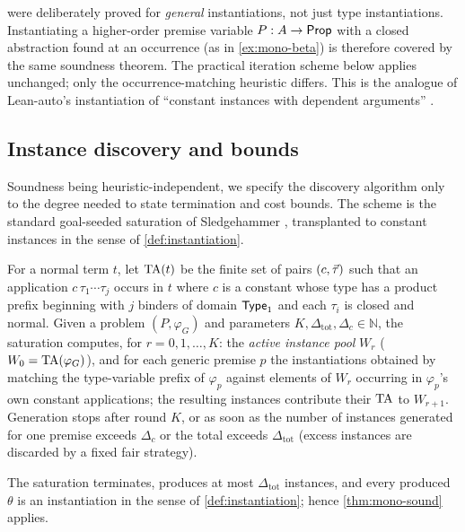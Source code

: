 \begin{remark}
\label{rem:tier2}
 were
deliberately proved for \emph{general} instantiations, not just type
instantiations.  Instantiating a higher-order premise variable
$P : A \to \mathsf{Prop}$ with a closed abstraction found at an occurrence
(as in \cref{ex:mono-beta}) is therefore covered by the same
soundness theorem.  The practical iteration scheme below applies
unchanged; only the occurrence-matching heuristic differs.  This is
the analogue of Lean-auto's instantiation of ``constant instances
with dependent arguments'' \cite{QianEtAl2025}.
\end{remark}

\subsection{Instance discovery and bounds}
\label{sec:saturation}

Soundness being heuristic-independent, we specify the discovery
algorithm only to the degree needed to state termination and cost
bounds.  The scheme is the standard goal-seeded saturation of
Sledgehammer \cite[\S7.1]{Blanchette2016}, transplanted to constant
instances in the sense of \cref{def:instantiation}.

\begin{definition}
\label{def:saturation}
For a normal term $t$, let $\mathrm{TA}(t)$ be the finite set of pairs
$(c, \vec{\tau})$ such that an application $c\,\tau_1 \cdots \tau_j$
occurs in $t$ where $c$ is a constant whose type has a product
prefix beginning with $j$ binders of domain $\mathsf{Type}_1$ and each
$\tau_i$ is closed and normal.  Given a problem $(P, \varphi_G)$ and
parameters $K, \Delta_{\mathrm{tot}}, \Delta_c \in \mathbb{N}$, the
saturation computes, for $r = 0, 1, \ldots, K$: the \emph{active
instance pool} $W_r$ ($W_0 = \mathrm{TA}(\varphi_G)$), and for each
generic premise $p$ the instantiations obtained by matching the
type-variable prefix of $\varphi_p$ against elements of $W_r$
occurring in $\varphi_p$'s own constant applications; the resulting
instances contribute their $\mathrm{TA}$ to $W_{r+1}$.  Generation stops
after round $K$, or as soon as the number of instances generated for
one premise exceeds $\Delta_c$ or the total exceeds
$\Delta_{\mathrm{tot}}$ (excess instances are discarded by a fixed
fair strategy).
\end{definition}

\begin{proposition}
\label{prop:saturation-bounds}
The saturation terminates, produces at most
$\Delta_{\mathrm{tot}}$ instances, and every produced $\theta$ is an
instantiation in the sense of \cref{def:instantiation}; hence
\cref{thm:mono-sound} applies.
\end{proposition}

